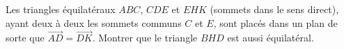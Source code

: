 Les triangles équilatéraux $ABC$, $CDE$ et $EHK$ (sommets dans le sens direct), ayant deux à deux les sommets communs $C$ et $E$, sont placés dans un plan de sorte que $\overrightarrow{AD} = \overrightarrow{DK}$. Montrer que le triangle $BHD$ est aussi équilatéral.
